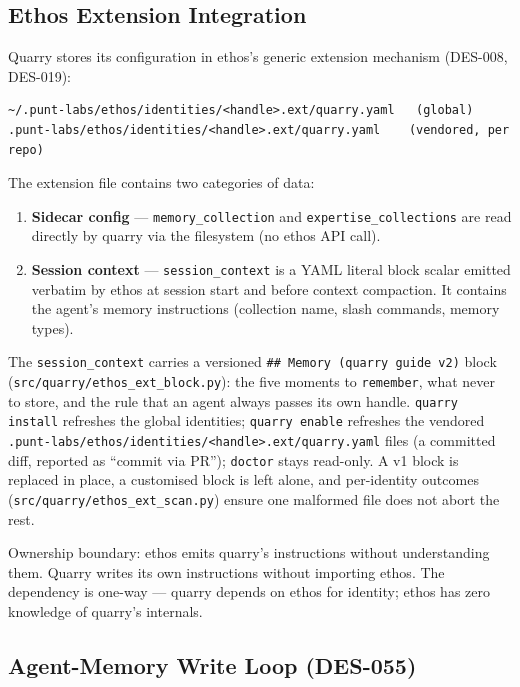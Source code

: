 \documentclass[a4paper,10pt]{article}
\newcommand{\modpath}[1]{\texttt{src/quarry/#1}}
\begin{document}
\subsection{Ethos Extension Integration}

Quarry stores its configuration in ethos's generic extension mechanism
(DES-008, DES-019):

\begin{verbatim}
~/.punt-labs/ethos/identities/<handle>.ext/quarry.yaml   (global)
.punt-labs/ethos/identities/<handle>.ext/quarry.yaml    (vendored, per repo)
\end{verbatim}

The extension file contains two categories of data:

\begin{enumerate}
  \item \textbf{Sidecar config} --- \texttt{memory\_collection} and
    \texttt{expertise\_collections} are read directly by quarry via the
    filesystem (no ethos API call).
  \item \textbf{Session context} --- \texttt{session\_context} is a YAML
    literal block scalar emitted verbatim by ethos at session start and
    before context compaction.  It contains the agent's memory instructions
    (collection name, slash commands, memory types).
\end{enumerate}

The \texttt{session\_context} carries a versioned \texttt{\#\# Memory
(quarry guide v2)} block (\modpath{ethos\_ext\_block.py}): the five
moments to \texttt{remember}, what never to store, and the rule that an
agent always passes its own handle.  \texttt{quarry install} refreshes the
global identities; \texttt{quarry enable} refreshes the vendored
\texttt{.punt-labs/ethos/identities/<handle>.ext/quarry.yaml} files (a
committed diff, reported as ``commit via PR''); \texttt{doctor} stays
read-only.  A v1 block is replaced in place, a customised block is left
alone, and per-identity outcomes (\modpath{ethos\_ext\_scan.py}) ensure one
malformed file does not abort the rest.

Ownership boundary: ethos emits quarry's instructions without understanding
them.  Quarry writes its own instructions without importing ethos.  The
dependency is one-way --- quarry depends on ethos for identity; ethos has
zero knowledge of quarry's internals.

\subsection{Agent-Memory Write Loop (DES-055)}
\end{document}
